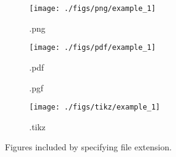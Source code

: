    \begin{figure}
        \begin{subfigure}[t]{0.45\textwidth}
        \texttt{[image: ./figs/png/example\_1]}
        \caption{.png}
        \label{figures:fig:exmaple:2:png}
        \end{subfigure}
        \hfill
        \begin{subfigure}[t]{0.45\textwidth}
        \texttt{[image: ./figs/pdf/example\_1]}
        \caption{.pdf}
        \label{figures:fig:exmaple:2:pdf}
        \end{subfigure}
        \begin{subfigure}[t]{0.45\textwidth}
        \resizebox*{\linewidth}{!}{}
        \caption{.pgf}
        \label{figures:fig:exmaple:2:pgf}
         \end{subfigure} 
        \hfill     
        \begin{subfigure}[t]{0.45\textwidth}
        \texttt{[image: ./figs/tikz/example\_1]}
        \caption{.tikz}
        \label{figures:fig:exmaple:2:tikz}
        \end{subfigure}     
        \caption{Figures included by specifying file extension.}   
        \label{figures:fig:example:2}
    \end{figure}
